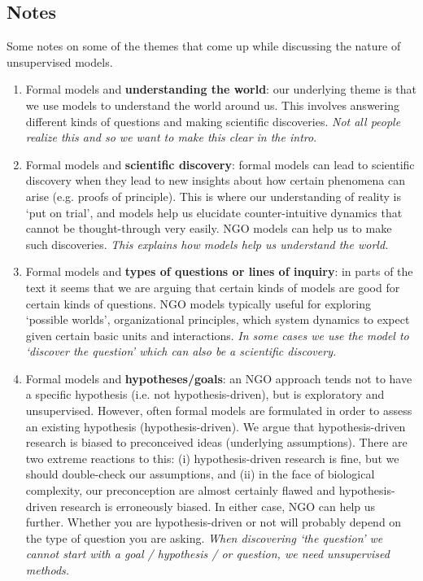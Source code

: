 \subsection{Notes}
Some notes on some of the themes that come up while discussing the nature of unsupervised models.
\begin{enumerate}
\item Formal models and \textbf{understanding the world}: our underlying theme is that we use models to understand the world around us. This involves answering different kinds of questions and making scientific discoveries. \textit{Not all people realize this and so we want to make this clear in the intro}.  
\item Formal models and \textbf{scientific discovery}: formal models can lead to scientific discovery when they lead to new insights about how certain phenomena can arise (e.g. proofs of principle). This is where our understanding of reality is `put on trial', and models help us elucidate counter-intuitive dynamics that cannot be thought-through very easily. NGO models can help us to make such discoveries. \textit{This explains how models help us understand the world.}  
\item Formal models and \textbf{types of questions or lines of inquiry}: in parts of the text it seems that we are arguing that certain kinds of models are good for certain kinds of questions. NGO models typically useful for exploring `possible worlds', organizational principles, which system dynamics to expect given certain basic units and interactions. \textit{In some cases we use the model to `discover the question' which can also be a scientific discovery.}  
\item Formal models and \textbf{hypotheses/goals}: an NGO approach tends not to have a specific hypothesis (i.e. not hypothesis-driven), but is exploratory and unsupervised. However, often formal models are formulated in order to assess an existing hypothesis (hypothesis-driven). We argue that hypothesis-driven research is biased to preconceived ideas (underlying assumptions). There are two extreme reactions to this: (i) hypothesis-driven research is fine, but we should double-check our assumptions, and (ii) in the face of biological complexity, our preconception are almost certainly flawed and hypothesis-driven research is erroneously biased. In either case, NGO can help us further. Whether you are hypothesis-driven or not will probably depend on the type of question you are asking. \textit{When discovering `the question' we cannot start with a goal / hypothesis / or question, we need unsupervised methods.}  

\end{enumerate}
